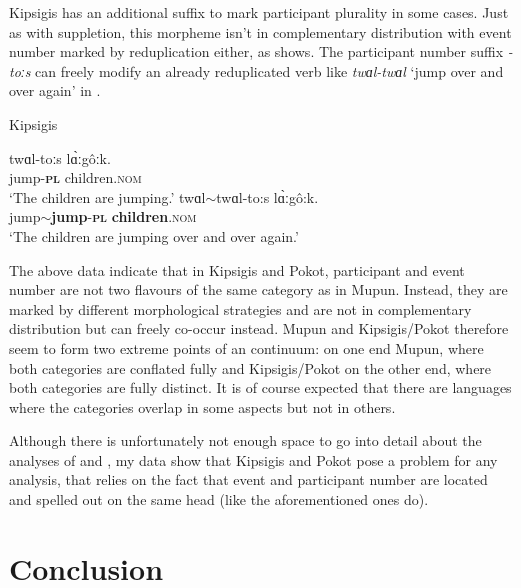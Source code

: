 \documentclass[output=paper,colorlinks,citecolor=brown
]{langscibook}
\begin{document}
\noindent Kipsigis has an additional suffix to mark participant plurality in some cases. Just as with suppletion, this morpheme isn't in complementary distribution with event number marked by reduplication either, as  shows. The participant number suffix \textit{-toːs} can freely modify an already reduplicated verb like \textit{twɑl-twɑl} `jump over and over again' in . 

\ea Kipsigis \cite[3]{KouneliProp}\label{ex:fiebig:toos}
\begin{xlist} 
\ex
\gll twɑl-toːs lɑ̀ːgôːk.\\
jump-\textsc{\textbf{pl}} children.\textsc{nom}\\
\glt `The children are jumping.' 
\ex \label{ex:fiebig:toos-red}
\gll twɑl$\sim$twɑl-to:s lɑ̀ːgô:k.\\
jump$\sim$\textbf{jump}-\textsc{\textbf{pl}} \textbf{children}.\textsc{nom}\\
\glt `The children are jumping over and over again.' 
\end{xlist}
\z

\noindent The above data indicate that in Kipsigis and Pokot, participant and event number are not two flavours of the same category as in Mupun. Instead, they are marked by different morphological strategies and are not in complementary distribution but can freely co-occur instead. Mupun and Kipsigis/Pokot therefore seem to form two extreme points of an continuum: on one end Mupun, where both categories are conflated fully and Kipsigis/Pokot on the other end, where both categories are fully distinct. It is of course expected that there are languages where the categories overlap in some aspects but not in others.

Although there is unfortunately not enough space to go into detail about the analyses of \citet{Amato2018} and \citet{Thornton2019}, my data show that Kipsigis and Pokot pose a problem for any analysis, that relies on the fact that event and participant number are located and spelled out on the same head (like the aforementioned ones do).


\section{Conclusion}
\end{document}
